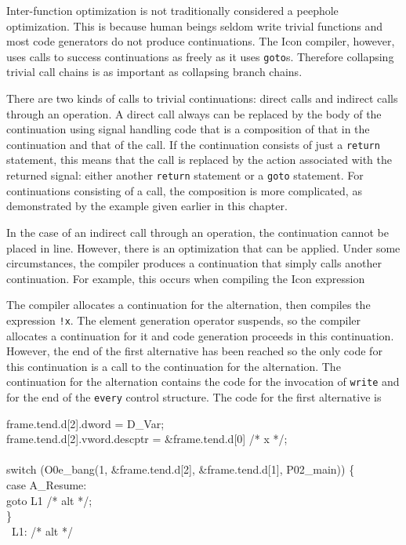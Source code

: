 Inter-function optimization is not traditionally considered a peephole
optimization. This is because human beings seldom write trivial
functions and most code generators do not produce continuations. The
Icon compiler, however, uses calls to success continuations as freely
as it uses \texttt{goto}s. Therefore collapsing trivial call chains is
as important as collapsing branch chains.

There are two kinds of calls to trivial continuations: direct calls
and indirect calls through an operation. A direct call always can be
replaced by the body of the continuation using signal handling code
that is a composition of that in the continuation and that of the
call. If the continuation consists of just a \texttt{return}
statement, this means that the call is replaced by the action
associated with the returned signal: either another \texttt{return}
statement or a \texttt{goto} statement. For continuations consisting
of a call, the composition is more complicated, as demonstrated by the
example given earlier in this chapter.

In the case of an indirect call through an operation, the continuation
cannot be placed in line. However, there is an optimization that can
be applied. Under some circumstances, the compiler produces a
continuation that simply calls another continuation. For example, this
occurs when compiling the Icon expression


The compiler allocates a continuation for the alternation, then
compiles the expression \texttt{!x}. The element generation operator
suspends, so the compiler allocates a continuation for it and code
generation proceeds in this continuation.  However, the end of the
first alternative has been reached so the only code for this
continuation is a call to the continuation for the alternation. The
continuation for the alternation contains the code for the invocation
of \texttt{write} and for the end of the \texttt{every} control
structure. The code for the first alternative is

\goodbreak
\begin{iconcode}
frame.tend.d[2].dword = D\_Var;\\
frame.tend.d[2].vword.descptr = \&frame.tend.d[0] /* x */;\\
\\
switch (O0e\_bang(1, \&frame.tend.d[2], \&frame.tend.d[1], P02\_main)) \{\\
\>case A\_Resume:\\
\>\>goto L1 /* alt */;\\
\>\}\\
\ L1: /* alt */\\
\end{iconcode}

